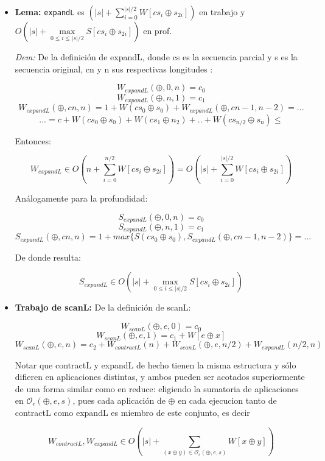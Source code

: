 \documentclass[12pt]{article}
\begin{document}
\begin{itemize}

\item \textbf{Lema:} \texttt{expandL} es $(|s| + \sum\limits_{i=0}^{|s|/2} W[cs_{i} \oplus s_{2i}])$ en trabajo y $O(|s| + \max\limits_{0 \leq i \leq |s|/2} S[cs_{i} \oplus s_{2i}])$ en prof.

 \textit{Dem:} De la definición de expandL, donde cs es la secuencia parcial y s es la secuencia original, cn y n sus respectivas longitudes :
    
    $$ W_{expandL}(\oplus, 0, n) = c_0 $$
    $$ W_{expandL}(\oplus, n, 1) = c_1 $$
    $$ W_{expandL}(\oplus, cn, n) = 1 + W(cs_0 \oplus s_0) + W_{expandL}(\oplus, cn-1, n-2) = ... $$
    $$ ... = c + W(cs_0 \oplus s_0) + W(cs_1 \oplus n_2) + .. + W(cs_{n/2} \oplus s_n) \leq $$

    Entonces:
    
    $$ W_{expandL} \in O(n + \sum\limits_{i=0}^{n/2} W[cs_{i} \oplus s_{2i}]) = O(|s| + \sum\limits_{i=0}^{|s|/2} W[cs_{i} \oplus s_{2i}]) $$
    
    Análogamente para la profundidad:
    
    $$ S_{expandL}(\oplus, 0, n) = c_0 $$
    $$ S_{expandL}(\oplus, n, 1) = c_1 $$
    $$ S_{expandL}(\oplus, cn, n) = 1 + max\{ S(cs_0 \oplus s_0), S_{expandL}(\oplus, cn-1, n-2)\} = ... $$
    
    De donde resulta:
    
    $$ S_{expandL} \in O(|s| + \max\limits_{0 \leq i \leq |s|/2} S[cs_{i} \oplus s_{2i}]) $$

\item \textbf{Trabajo de scanL:}
    De la definición de scanL:
    
    $$ W_{scanL}(\oplus, e, 0) = c_0 $$
    $$ W_{scanL}(\oplus, e, 1) = c_1 + W[e \oplus x]  $$
    $$ W_{scanL}(\oplus, e, n) = c_2 + W_{contractL}(n) + W_{scanL}(\oplus, e, n/2) + W_{expandL}(n/2, n) $$
    
    Notar que contractL y expandL de hecho tienen la misma estructura y sólo difieren en aplicaciones distintas, y ambos pueden ser acotados superiormente de una forma similar como en reduce: eligiendo la sumatoria de aplicaciones en $\mathcal{O}_r(\oplus,e,s)$, pues cada aplicación de $\oplus$ en cada ejecucion tanto de contractL como expandL es miembro de este conjunto, es decir
    
    $$ W_{contractL}, W_{expandL} \in O(|s| + \sum\limits_{(x\oplus y)\in\mathcal{O}_r(\oplus,e,s)} W[x\oplus y]) $$
    

\end{itemize}
\end{document}
